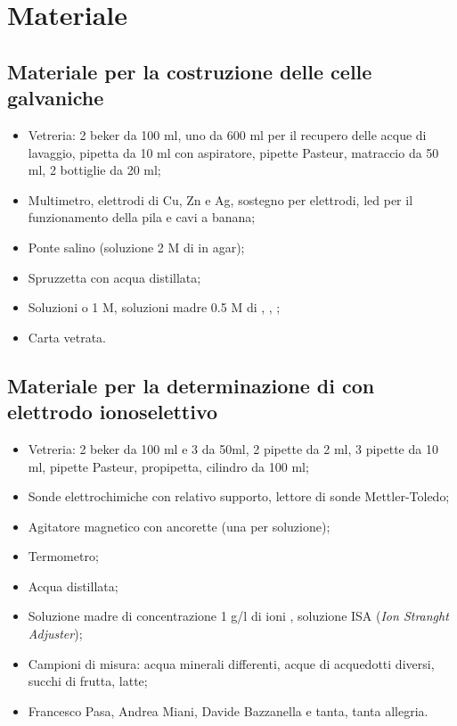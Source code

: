 \section*{Materiale}

\subsection*{Materiale per la costruzione delle celle galvaniche}

\begin{itemize}
        \setlength{\parskip}{0pt}
        \item{Vetreria: 2 beker da 100 ml, uno da 600 ml per il recupero delle acque di lavaggio, 
            pipetta da 10 ml con aspiratore, pipette Pasteur,
            matraccio da 50 ml, 2 bottiglie da 20 ml;}
        \item{Multimetro, elettrodi di Cu, Zn e Ag,
            sostegno per elettrodi, led per il funzionamento della pila e cavi a banana;}
        \item{Ponte salino (soluzione 2 M di  in agar);}
        \item{Spruzzetta con acqua distillata;}
        \item{Soluzioni  o  1 M, soluzioni madre 0.5 M di , , ;}
        \item{Carta vetrata.}
\end{itemize}

\subsection*{Materiale per la determinazione di  con elettrodo ionoselettivo}

\begin{itemize}
        \setlength{\parskip}{0pt}
        \item{Vetreria: 2 beker da 100 ml e 3 da 50ml, 2 pipette da 2 ml, 3 pipette da 10 ml, pipette Pasteur,
            propipetta, cilindro da 100 ml;}
        \item{Sonde elettrochimiche con relativo supporto, lettore di sonde Mettler-Toledo;}
        \item{Agitatore magnetico con ancorette (una per soluzione);}
        \item{Termometro;}
        \item{Acqua distillata;}
        \item{Soluzione madre di concentrazione 1 g/l di ioni , soluzione ISA (\emph{Ion Stranght
            Adjuster});}
        \item{Campioni di misura: acqua minerali differenti, acque di acquedotti diversi, succhi di frutta, latte;}
        \item{Francesco Pasa, Andrea Miani, Davide Bazzanella e tanta, tanta allegria.}
\end{itemize}

